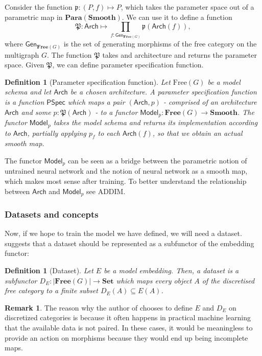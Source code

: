 \documentclass[12pt,a4paper,openright,twoside]{report}
\theoremstyle{plain}
\newtheorem{definition}[proposition]{Definition}
\theoremstyle{definition}
\newtheorem{remark}[proposition]{Remark}
\begin{document}
Consider the function $\mathfrak{p}: (P,f) \mapsto P$, which takes the parameter space out of a parametric map in $\mathbf{Para}(\mathbf{Smooth})$. We can use it to define a function 
\[\mathfrak{P}: \mathsf{Arch} \mapsto \prod_{f : \mathsf{Gen}_{\mathbf{Free}(G)}}\mathfrak{p}(\mathsf{Arch}(f)),\]
where $\mathsf{Gen}_{\mathbf{Free}(G)}$ is the set of generating morphisms of the free category on the multigraph $G$. The function $\mathfrak{P}$ takes and architecture and returns the parameter space. Given $\mathfrak{P}$, we can define parameter specification function.

\begin{definition}[Parameter specification function]
  Let $\mathrm{Free}(G)$ be a model schema and let $\mathsf{Arch}$ be a chosen architecture. A parameter specification function is a function $\mathsf{PSpec}$ which maps a pair $(\mathsf{Arch}, p)$ - comprised of an architecture $\mathsf{Arch}$ and some $p : \mathfrak{P}(\mathsf{Arch})$ - to a functor $\mathsf{Model}_p: \mathbf{Free}(G) \to \mathbf{Smooth}$. The functor $\mathsf{Model}_p$ takes the model schema and returns its implementation according to $\mathsf{Arch}$, partially applying $p_f$ to each $\mathsf{Arch}(f)$, so that we obtain an actual smooth map. 
\end{definition}

The functor $\mathsf{Model}_p$ can be seen as a bridge between the parametric notion of untrained neural network and the notion of neural network as a smooth map, which makes most sense after training. To better understand the relationship between $\mathsf{Arch}$ and $\mathsf{Model}_p$ see ADDIM.

\subsubsection{Datasets and concepts}

Now, if we hope to train the model we have defined, we will need a dataset. \cite{gavranovic2019compositional} suggests that a dataset should be represented as a subfunctor of the embedding functor:

\begin{definition}[Dataset]
  Let $E$ be a model embedding. Then, a dataset is a subfunctor $D_E: |\mathbf{Free}(G)| \to \mathbf{Set}$ which maps every object $A$ of the discretised free category to a finite subset $D_E(A) \subseteq E(A)$.
\end{definition}

\begin{remark}
  The reason why the author of \cite{gavranovic2019compositional} chooses to define $E$ and $D_E$ on discretized categories is because it often happens in practical machine learning that the available data is not paired. In these cases, it would be meaningless to provide an action on morphisms because they would end up being incomplete maps.
\end{remark}
\end{document}
